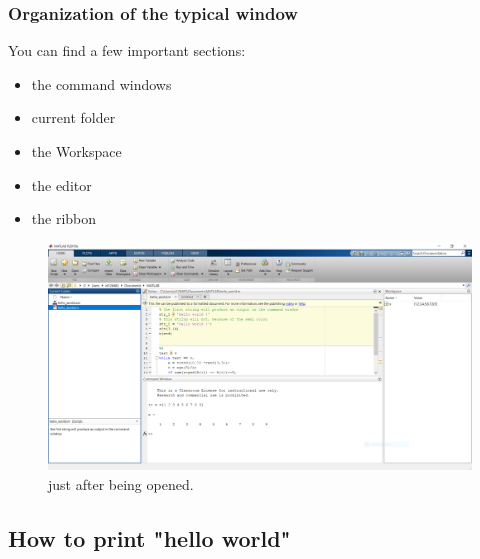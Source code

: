 		\subsubsection{Organization of the typical \matlab window}

		You can find a few important sections:
		\begin{itemize}
			\item the command windows \\
			\item current folder \\
			\item the Workspace \\
			\item the editor \\
			\item the ribbon \\
		\end{itemize}

		\begin{figure}
			\center
			\includegraphics[width=0.95\linewidth]{./fig/matlab.PNG}
			\caption{
				\matlab just after being opened.
			}
			\label{fig-matlab}
		\end{figure}
	\subsection{How to print "hello world"}

